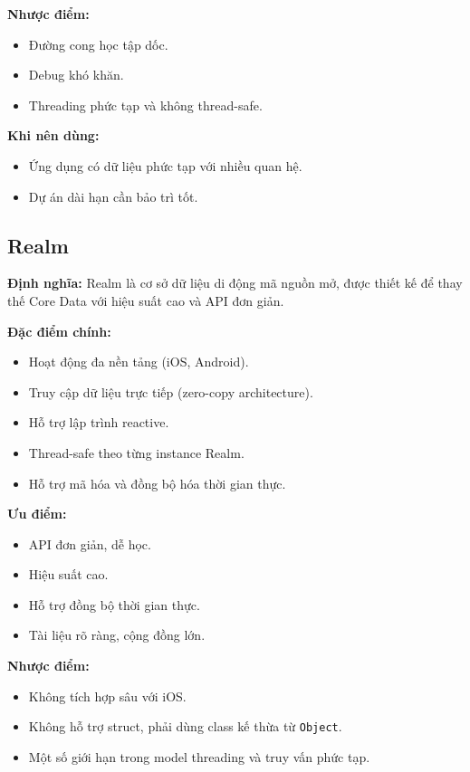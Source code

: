 \textbf{Nhược điểm:}
\begin{itemize}
    \item Đường cong học tập dốc.
    \item Debug khó khăn.
    \item Threading phức tạp và không thread-safe.
\end{itemize}

\textbf{Khi nên dùng:}
\begin{itemize}
    \item Ứng dụng có dữ liệu phức tạp với nhiều quan hệ.
    \item Dự án dài hạn cần bảo trì tốt.
\end{itemize}

\subsection{Realm}

\textbf{Định nghĩa:} Realm là cơ sở dữ liệu di động mã nguồn mở, được thiết kế để thay thế Core Data với hiệu suất cao và API đơn giản.

\textbf{Đặc điểm chính:}
\begin{itemize}
    \item Hoạt động đa nền tảng (iOS, Android).
    \item Truy cập dữ liệu trực tiếp (zero-copy architecture).
    \item Hỗ trợ lập trình reactive.
    \item Thread-safe theo từng instance Realm.
    \item Hỗ trợ mã hóa và đồng bộ hóa thời gian thực.
\end{itemize}

\textbf{Ưu điểm:}
\begin{itemize}
    \item API đơn giản, dễ học.
    \item Hiệu suất cao.
    \item Hỗ trợ đồng bộ thời gian thực.
    \item Tài liệu rõ ràng, cộng đồng lớn.
\end{itemize}

\textbf{Nhược điểm:}
\begin{itemize}
    \item Không tích hợp sâu với iOS.
    \item Không hỗ trợ struct, phải dùng class kế thừa từ \texttt{Object}.
    \item Một số giới hạn trong model threading và truy vấn phức tạp.
\end{itemize}

